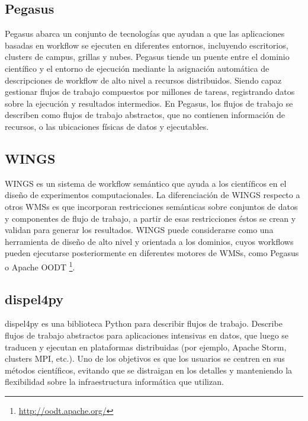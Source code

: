 \subsection{Pegasus}
Pegasus\cite{deelman2004pegasus} abarca un conjunto de tecnologías que ayudan a que las aplicaciones basadas en workflow se ejecuten en diferentes entornos, incluyendo escritorios, clusters de campus, grillas y nubes. Pegasus tiende un puente entre el dominio científico y el entorno de ejecución mediante la asignación automática de descripciones de workflow de alto nivel a recursos distribuidos. 
Siendo capaz gestionar flujos de trabajo compuestos por millones de tareas, registrando datos sobre la ejecución y resultados intermedios.
En Pegasus, los flujos de trabajo se describen como flujos de trabajo abstractos, que no contienen información de recursos, o las ubicaciones físicas de datos y ejecutables.

\subsection{WINGS}  
 
WINGS \cite{DBLP:journals/expert/GilRKGGMD11} es un sistema de workflow semántico que ayuda a los científicos en el diseño de experimentos computacionales.
La diferenciación de WINGS respecto a otros WMSs es que incorporan restricciones semánticas sobre conjuntos de datos y componentes de flujo de trabajo, a partir de esas restricciones éstos se crean y validan para generar los resultados.  
WINGS puede considerarse como una herramienta de diseño de alto nivel y orientada a los dominios, cuyos workflows pueden ejecutarse posteriormente en diferentes motores de WMSs, como Pegasus~\cite{deelman2004pegasus} o Apache OODT \footnote{\url{http://oodt.apache.org/}}.

\subsection{dispel4py}
dispel4py \cite{DBLP:conf/eScience/FilgueiraKAKSS15}  es una biblioteca Python para describir flujos de trabajo. 
 Describe flujos de trabajo abstractos para aplicaciones intensivas en datos, que luego se traducen y ejecutan en plataformas distribuidas (por ejemplo, Apache Storm, clusters MPI, etc.).
Uno de los objetivos es que los usuarios se centren en sus métodos científicos, evitando que se distraigan en los detalles y manteniendo la flexibilidad sobre la infraestructura informática que utilizan. 


